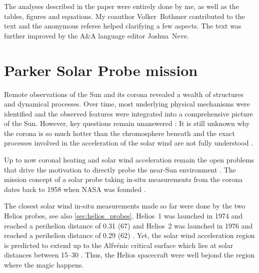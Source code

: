 The analyses described in the paper were entirely done by me, as well as the tables, figures and equations. My coauthor Volker~Bothmer contributed to the text and the anonymous referee helped clarifying a few aspects. The text was further improved by the A\&A language editor Joshua~Neve.\\


\section{Parker Solar Probe mission}
Remote observations of the Sun and its corona revealed a wealth of structures and dynamical processes. Over time, most underlying physical mechanisms were identified and the observed features were integrated into a comprehensive picture of the Sun. However, key questions remain unanswered \citep{McComas2007}: It is still unknown why the corona is so much hotter than the chromosphere beneath \citep{Klimchuk2006} and the exact processes involved in the acceleration of the solar wind are not fully understood \citep{Hollweg1985,Cranmer2017}.

Up to now coronal heating and solar wind acceleration remain the open problems that drive the motivation to directly probe the near-Sun environment \citep{McComas2007,Fox2015}. The mission concept of a solar probe taking in-situ measurements from the corona dates back to 1958 when NASA was founded \citep{McComas200807}.

The closest solar wind in-situ measurements made so far were done by the two Helios probes, see also \autoref{sec:helios_probes}. Helios~1 was launched in 1974 and reached a perihelion distance of \SI{0.31}{\au} (\SI{67}{\Rs}) and Helios~2 was launched in 1976 and reached a perihelion distance of \SI{0.29}{\au} (\SI{62}{\Rs}) \citep{Rosenbauer1977}. Yet, the solar wind acceleration region is predicted to extend up to the Alfvénic critical surface which lies at solar distances between \SIrange{15}{30}{\Rs} \citep{Katsikas2010,Goelzer2014}. Thus, the Helios spacecraft were well bejond the region where the magic happens.


